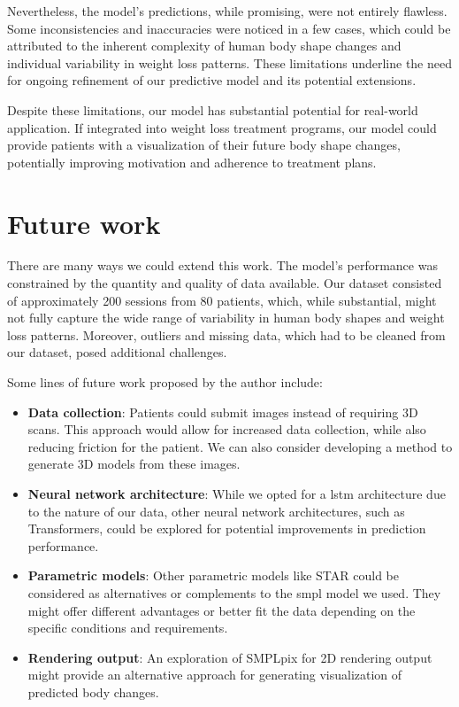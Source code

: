 Nevertheless, the model's predictions, while promising, were not entirely
flawless. Some inconsistencies and inaccuracies were noticed in a few cases,
which could be attributed to the inherent complexity of human body shape
changes and individual variability in weight loss patterns. These limitations
underline the need for ongoing refinement of our predictive model and its
potential extensions.

Despite these limitations, our model has substantial potential for real-world
application. If integrated into weight loss treatment programs, our model could
provide patients with a visualization of their future body shape changes,
potentially improving motivation and adherence to treatment plans.

\section{Future work}

There are many ways we could extend this work. The model's performance was
constrained by the quantity and quality of data available. Our dataset
consisted of approximately 200 sessions from 80 patients, which, while
substantial, might not fully capture the wide range of variability in human
body shapes and weight loss patterns. Moreover, outliers and missing data,
which had to be cleaned from our dataset, posed additional challenges.

Some lines of future work proposed by the author include:

\begin{itemize}
      \item \textbf{Data collection}: Patients could submit images instead of
            requiring 3D scans. This approach would allow for increased data collection,
            while also reducing friction for the patient. We can also consider
            developing a method to generate 3D models from these images.

      \item \textbf{Neural network architecture}: While we opted for a \gls{lstm}
            architecture due to the nature of our data, other neural network architectures,
            such as Transformers, could be explored for potential improvements in
            prediction performance.

      \item \textbf{Parametric models}: Other parametric models like STAR could
            be considered as alternatives or complements to the \gls{smpl}
            model we used. They might offer different advantages or better fit
            the data depending on the specific conditions and requirements.

      \item \textbf{Rendering output}: An exploration of SMPLpix \citep{prokudin2021smplpix} for 2D
            rendering output might provide an alternative approach for generating
            visualization of predicted body changes.
\end{itemize}